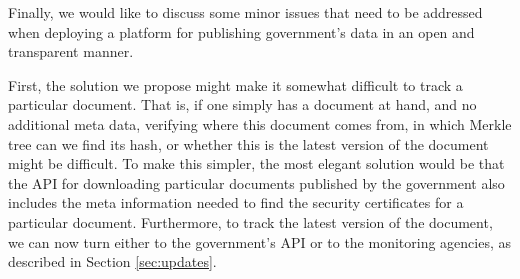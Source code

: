 	
Finally, we would like to discuss some minor issues that need to be addressed when deploying a platform for publishing government's data in an open and transparent manner.

First, the solution we propose might make it somewhat difficult to track a particular document. That is, if one simply has a document at hand, and no additional meta data, verifying where this document comes from, in which Merkle tree can we find its hash, or whether this is the latest version of the document might be difficult. To make this simpler, the most elegant solution would be that the API for downloading particular documents published by the government also includes the meta information needed to find the security certificates for a particular document. Furthermore, to track the latest version of the document, we can now turn either to the government's API or to the monitoring agencies, as described in Section \ref{sec:updates}.



